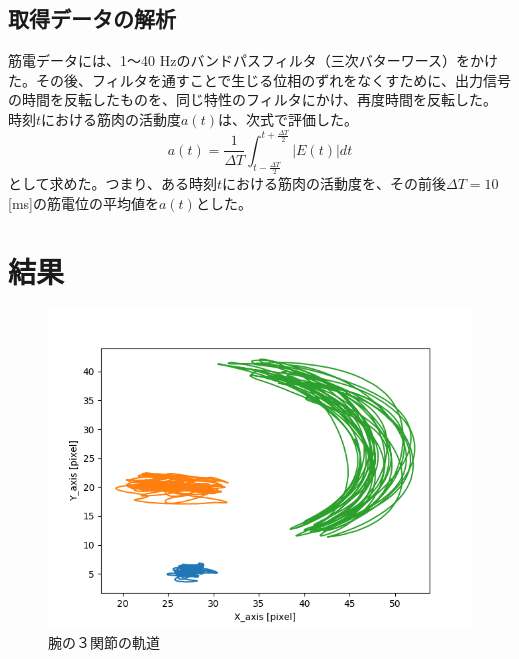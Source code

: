 \documentclass{jsarticle}
\begin{document}
\subsection{取得データの解析}
筋電データには、1〜40 Hzのバンドパスフィルタ（三次バターワース）をかけた。その後、フィルタを通すことで生じる位相のずれをなくすために、出力信号の時間を反転したものを、同じ特性のフィルタにかけ、再度時間を反転した。
時刻$t$における筋肉の活動度$a(t)$は、次式で評価した。
$$a(t) = \frac{1}{\Delta T} \int_{t-\frac{\Delta T}{2}}^{t+\frac{\Delta T}{2}} |E(t)|dt $$
として求めた。つまり、ある時刻$t$における筋肉の活動度を、その前後$\Delta T = 10$ [ms]の筋電位の平均値を$a(t)$とした。

\clearpage
\section{結果}

\begin{figure}[htbp]
	\begin{center} %
		\includegraphics[width=12cm]{graph_image/slow_kidou.png}
		\caption{腕の３関節の軌道} %
		\label{fig:kidou} %
	\end{center}
\end{figure}
\end{document}
